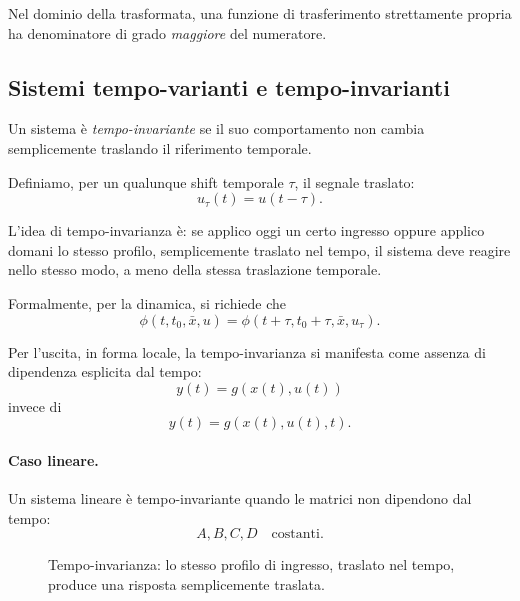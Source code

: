 Nel dominio della trasformata, una funzione di trasferimento strettamente propria ha denominatore di grado \emph{maggiore} del numeratore.

\subsection{Sistemi tempo-varianti e tempo-invarianti}

Un sistema è \emph{tempo-invariante} se il suo comportamento non cambia semplicemente traslando il riferimento temporale.

Definiamo, per un qualunque shift temporale $\tau$, il segnale traslato:
\[
u_\tau(t)=u(t-\tau).
\]

L'idea di tempo-invarianza è: se applico oggi un certo ingresso oppure applico domani lo stesso profilo, semplicemente traslato nel tempo, il sistema deve reagire nello stesso modo, a meno della stessa traslazione temporale.

Formalmente, per la dinamica, si richiede che
\[
\phi(t,t_0,\bar x,u)=\phi(t+\tau,t_0+\tau,\bar x,u_\tau).
\]

Per l'uscita, in forma locale, la tempo-invarianza si manifesta come assenza di dipendenza esplicita dal tempo:
\[
y(t)=g(x(t),u(t))
\]
invece di
\[
y(t)=g(x(t),u(t),t).
\]

\paragraph{Caso lineare.}
Un sistema lineare è tempo-invariante quando le matrici non dipendono dal tempo:
\[
A,B,C,D \quad \text{costanti}.
\]

\begin{figure}[H]
\centering
{}
\caption{Tempo-invarianza: lo stesso profilo di ingresso, traslato nel tempo, produce una risposta semplicemente traslata.}
\end{figure}

